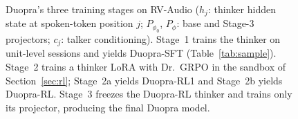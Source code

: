 \begin{figure}[t]
\centering
{}
\caption{Duopra's three training stages on RV-Audio
($h_j$: thinker hidden state at spoken-token position $j$; $P_{\phi_0}$, $P_\phi$: base and Stage-3 projectors; $c_j$: talker conditioning).
Stage~1 trains the thinker on unit-level sessions and yields Duopra-SFT (Table~\ref{tab:sample}).
Stage~2 trains a thinker LoRA with Dr.~GRPO in the sandbox of Section~\ref{sec:rl}; Stage~2a yields Duopra-RL1 and Stage~2b yields Duopra-RL.
Stage~3 freezes the Duopra-RL thinker and trains only its projector, producing the final Duopra model.}
\label{fig:method}
\end{figure}
